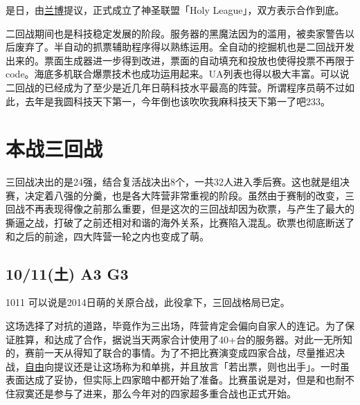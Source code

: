 是日，由\uline{兰博}提议，正式成立了神圣联盟「Holy League」，双方表示合作到底。

二回战期间也是科技稳定发展的阶段。服务器的黑魔法因为的滥用，被卖家警告以后废弃了。半自动的抓票辅助程序得以熟练运用。全自动的挖掘机也是二回战开发出来的。票面生成器进一步得到改进，票面的自动填充和投放也使得投票不再限于code。海底多机联合爆票技术也成功运用起来。UA列表也得以极大丰富。可以说二回战的已经成为了至少是近几年日萌科技水平最高的阵营。所谓程序员萌不过如此，去年是我圆科技天下第一，今年倒也该吹吹我麻科技天下第一了吧233。

\chapter{本战三回战}

三回战决出的是24强，结合复活战决出8个，一共32人进入季后赛。这也就是组决赛，决定着八强的分羹，也是各大阵营非常重视的阶段。虽然由于赛制的改变，三回战不再表现得像之前那么重要，但是这次的三回战却因为砍票，与产生了最大的撕逼之战，打破了之前还相对和谐的海外关系，比赛陷入混乱。砍票也彻底断送了和之后的前途，四大阵营一轮之内也变成了萌。

\section{10/11(土) A3 G3}



1011 可以说是2014日萌的关原合战，此役拿下，三回战格局已定。

这场选择了对抗的道路，毕竟作为三出场，阵营肯定会偏向自家人的连记。为了保证胜算，和达成了合作，据说当天两家合计使用了40+台的服务器。对此一无所知的，赛前一天从得知了联合的事情。为了不把比赛演变成四家合战，尽量推迟决战，\uline{自由}向提议还是让这场称为和单挑，并且放言「若出票，则也出手」。一时虽表面达成了妥协，但实际上四家暗中都开始了准备。比赛虽说是对，但是和也耐不住寂寞还是参与了进来，那么今年对的四家超多重合战也正式开始。

